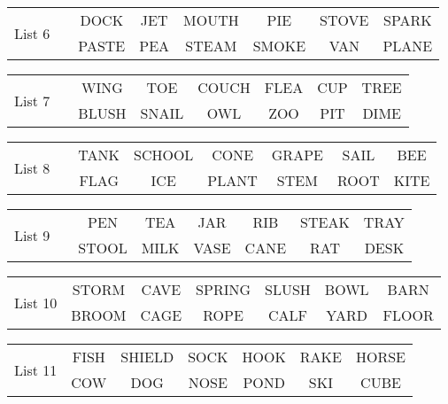 \documentclass{article}
\begin{document}
\vspace{.1in}
\hspace{.5in}\begin{tabular}{r||c c c c c c }
\multirow{2}{*}{List 6~~} & DOCK & JET & MOUTH & PIE & STOVE & SPARK\\
\cline{2-7}			& PASTE & PEA & STEAM & SMOKE & VAN & PLANE\\
\end{tabular}

\vspace{.1in}
\hspace{.5in}\begin{tabular}{r||c c c c c c }
\multirow{2}{*}{List 7~~} & WING & TOE & COUCH & FLEA & CUP & TREE\\
\cline{2-7}			& BLUSH & SNAIL & OWL & ZOO & PIT & DIME\\
\end{tabular}

\vspace{.1in}
\hspace{.5in}\begin{tabular}{r||c c c c c c }
\multirow{2}{*}{List 8~~} & TANK & SCHOOL & CONE & GRAPE & SAIL & BEE\\
\cline{2-7}			& FLAG & ICE & PLANT & STEM & ROOT & KITE\\
\end{tabular}

\vspace{.1in}
\hspace{.5in}\begin{tabular}{r||c c c c c c }
\multirow{2}{*}{List 9~~} & PEN & TEA & JAR & RIB & STEAK & TRAY\\
\cline{2-7}			& STOOL & MILK & VASE & CANE & RAT & DESK\\
\end{tabular}

\vspace{.1in}
\hspace{.5in}\begin{tabular}{r||c c c c c c }
\multirow{2}{*}{List 10} & STORM & CAVE & SPRING & SLUSH & BOWL & BARN\\
\cline{2-7}			& BROOM & CAGE & ROPE & CALF & YARD & FLOOR\\
\end{tabular}

\vspace{.1in}
\hspace{.5in}\begin{tabular}{r||c c c c c c }
\multirow{2}{*}{List 11} & FISH & SHIELD & SOCK & HOOK & RAKE & HORSE\\
\cline{2-7}			& COW & DOG & NOSE & POND & SKI & CUBE\\
\end{tabular}
\end{document}

